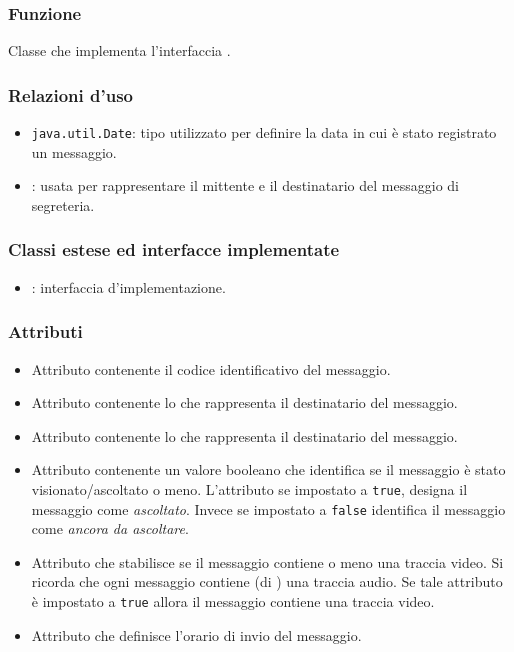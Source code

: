
\subsubsection*{Funzione}
Classe che implementa l'interfaccia .

\subsubsection*{Relazioni d'uso}
\begin{itemize}
	\item \texttt{java.util.Date}: tipo utilizzato per definire la data in cui è stato registrato un messaggio.
	\item {}: usata per rappresentare il mittente e il destinatario del messaggio di segreteria.
\end{itemize}

\subsubsection*{Classi estese ed interfacce implementate}
\begin{itemize}
	\item {}: interfaccia d'implementazione.
\end{itemize}

\subsubsection*{Attributi}

\begin{itemize}
	\item{}
	Attributo contenente il codice identificativo del messaggio.
	\item{}
	Attributo contenente lo  che rappresenta il destinatario del messaggio.
	\item{}
	Attributo contenente lo  che rappresenta il destinatario del messaggio.
	\item{}
	Attributo contenente un valore booleano che identifica se il messaggio è stato visionato/ascoltato o meno. L'attributo se impostato a \texttt{true}, designa il messaggio come \textit{ascoltato}. Invece se impostato a \texttt{false} identifica il messaggio come \textit{ancora da ascoltare}.
	\item{}
	Attributo che stabilisce se il messaggio contiene o meno una traccia video. Si ricorda che ogni messaggio contiene (di ) una traccia audio. Se tale attributo è impostato a \texttt{true} allora il messaggio contiene una traccia video.
	\item{}
	Attributo che definisce l'orario di invio del messaggio.
\end{itemize}

